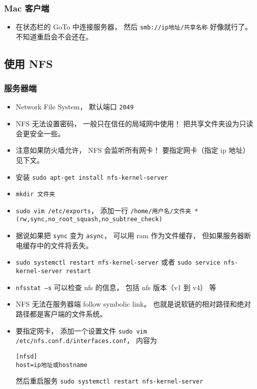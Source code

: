\subsubsection{Mac 客户端}
\begin{itemize}
\item 在状态栏的 GoTo 中连接服务器， 然后 \verb`smb://ip地址/共享名称` 好像就行了。不知道重启会不会还在。
\end{itemize}

\subsection{使用 NFS}
\subsubsection{服务器端}
\begin{itemize}
\item Network File System， 默认端口 \verb`2049`
\item NFS 无法设置密码， 一般只在信任的局域网中使用！ 把共享文件夹设为只读会更安全一些。
\item 注意如果防火墙允许， NFS 会监听所有网卡！ 要指定网卡（指定 ip 地址）见下文。
\item 安装 \verb`sudo apt-get install nfs-kernel-server`
\item \verb`mkdir 文件夹`
\item \verb`sudo vim /etc/exports`， 添加一行 \verb`/home/用户名/文件夹 *(rw,sync,no_root_squash,no_subtree_check)`
\item 据说如果把 \verb`sync` 变为 \verb`async`， 可以用 ram 作为文件缓存， 但如果服务器断电缓存中的文件将丢失。
\item \verb`sudo systemctl restart nfs-kernel-server` 或者 \verb`sudo service nfs-kernel-server restart`
\item \verb`nfsstat –s` 可以检查 nfs 的信息， 包括 nfs 版本（v1 到 v4） 等
\item NFS 无法在服务器端 follow symbolic link。 也就是说软链的相对路径和绝对路径都是客户端的文件系统。
\item 要指定网卡， 添加一个设置文件 \verb`sudo vim /etc/nfs.conf.d/interfaces.conf`， 内容为
\begin{lstlisting}[language=none]
[nfsd]
host=ip地址或hostname
\end{lstlisting}
然后重启服务 \verb`sudo systemctl restart nfs-kernel-server`
\end{itemize}


